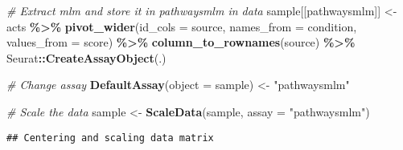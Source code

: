\documentclass[
]{article}
\newenvironment{Shaded}{\begin{snugshade}}{\end{snugshade}}
\newcommand{\AttributeTok}[1]{\textcolor[rgb]{0.13,0.29,0.53}{#1}}
\newcommand{\CommentTok}[1]{\textcolor[rgb]{0.56,0.35,0.01}{\textit{#1}}}
\newcommand{\FunctionTok}[1]{\textcolor[rgb]{0.13,0.29,0.53}{\textbf{#1}}}
\newcommand{\NormalTok}[1]{#1}
\newcommand{\OtherTok}[1]{\textcolor[rgb]{0.56,0.35,0.01}{#1}}
\newcommand{\SpecialCharTok}[1]{\textcolor[rgb]{0.81,0.36,0.00}{\textbf{#1}}}
\newcommand{\StringTok}[1]{\textcolor[rgb]{0.31,0.60,0.02}{#1}}
\begin{document}
\begin{Shaded}
\begin{Highlighting}[]
\CommentTok{\# Extract mlm and store it in pathwaysmlm in data}
\NormalTok{sample[[}\StringTok{\textquotesingle{}pathwaysmlm\textquotesingle{}}\NormalTok{]] }\OtherTok{\textless{}{-}}\NormalTok{ acts }\SpecialCharTok{\%\textgreater{}\%}
  \FunctionTok{pivot\_wider}\NormalTok{(}\AttributeTok{id\_cols =} \StringTok{\textquotesingle{}source\textquotesingle{}}\NormalTok{, }\AttributeTok{names\_from =} \StringTok{\textquotesingle{}condition\textquotesingle{}}\NormalTok{,}
              \AttributeTok{values\_from =} \StringTok{\textquotesingle{}score\textquotesingle{}}\NormalTok{) }\SpecialCharTok{\%\textgreater{}\%}
  \FunctionTok{column\_to\_rownames}\NormalTok{(}\StringTok{\textquotesingle{}source\textquotesingle{}}\NormalTok{) }\SpecialCharTok{\%\textgreater{}\%}
\NormalTok{  Seurat}\SpecialCharTok{::}\FunctionTok{CreateAssayObject}\NormalTok{(.)}

\CommentTok{\# Change assay}
\FunctionTok{DefaultAssay}\NormalTok{(}\AttributeTok{object =}\NormalTok{ sample) }\OtherTok{\textless{}{-}} \StringTok{"pathwaysmlm"}

\CommentTok{\# Scale the data}
\NormalTok{sample }\OtherTok{\textless{}{-}} \FunctionTok{ScaleData}\NormalTok{(sample, }\AttributeTok{assay =} \StringTok{"pathwaysmlm"}\NormalTok{)}
\end{Highlighting}
\end{Shaded}

\begin{verbatim}
## Centering and scaling data matrix
\end{verbatim}

\begin{Shaded}
\end{Shaded}
\end{document}
